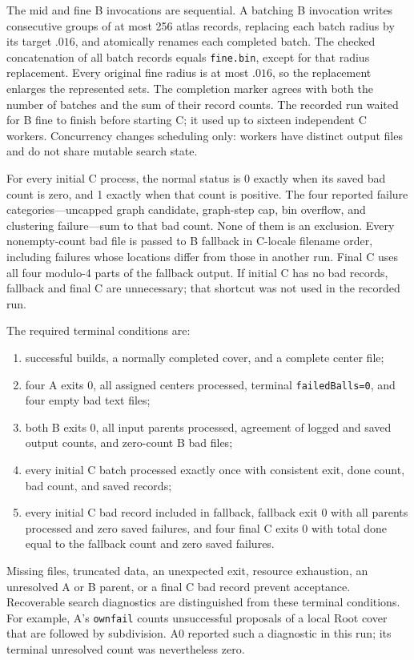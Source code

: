 The mid and fine B invocations are sequential. A batching B invocation
writes consecutive groups of at most 256 atlas records, replacing each
batch radius by its target $.016$, and atomically renames each completed
batch. The checked concatenation of all batch records equals
\texttt{fine.bin}, except for that radius replacement. Every original
fine radius is at most $.016$, so the replacement enlarges the represented
sets. The completion marker agrees with both the number of batches and
the sum of their record counts. The recorded run waited for B fine to
finish before starting C; it used up to sixteen independent C workers.
Concurrency changes scheduling only: workers have distinct output files
and do not share mutable search state.

For every initial C process, the normal status is 0 exactly when its
saved bad count is zero, and 1 exactly when that count is positive.
The four reported failure categories---uncapped graph candidate,
graph-step cap, bin overflow, and clustering failure---sum to that bad
count. None of them is an exclusion. Every nonempty-count bad file is
passed to B fallback in C-locale filename order, including failures whose
locations differ from those in another run. Final C uses all four
modulo-4 parts of the fallback output. If initial C has no bad records,
fallback and final C are unnecessary; that shortcut was not used in the
recorded run.

The required terminal conditions are:
\begin{enumerate}
\item successful builds, a normally completed cover, and a complete
      center file;
\item four A exits 0, all assigned centers processed, terminal
      \texttt{failedBalls=0}, and four empty bad text files;
\item both B exits 0, all input parents processed, agreement of logged
      and saved output counts, and zero-count B bad files;
\item every initial C batch processed exactly once with consistent
      exit, done count, bad count, and saved records;
\item every initial C bad record included in fallback, fallback exit 0
      with all parents processed and zero saved failures, and four
      final C exits 0 with total done equal to the fallback count and
      zero saved failures.
\end{enumerate}
Missing files, truncated data, an unexpected exit, resource exhaustion,
an unresolved A or B parent, or a final C bad record prevent acceptance.
Recoverable search diagnostics are distinguished from these terminal
conditions. For example, A's \texttt{ownfail} counts unsuccessful
proposals of a local Root cover that are followed by subdivision. A0
reported such a diagnostic in this run; its terminal unresolved count
was nevertheless zero.

